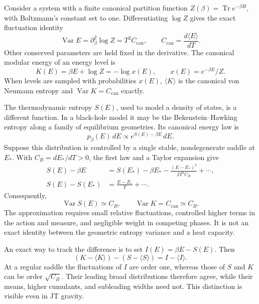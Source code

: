\documentclass[11pt,letterpaper]{article}
\theoremstyle{plain}
\theoremstyle{definition}
\theoremstyle{remark}
\begin{document}
Consider a system with a finite canonical partition function
$Z(\beta)=\operatorname{Tr}e^{-\beta H}$, with Boltzmann's constant set to one.
Differentiating $\log Z$ gives the exact fluctuation identity
\begin{equation}
 \operatorname{Var}E=\partial_\beta^2\log Z=T^2C_{\mathrm{can}},
 \qquad C_{\mathrm{can}}=\frac{d\langle E\rangle}{dT}.
 \label{eq08:energy_fluctuations}
\end{equation}
Other conserved parameters are held fixed in the derivative. The canonical
modular energy of an energy level is
\begin{equation}
 K(E)=\beta E+\log Z=-\log x(E),\qquad
 x(E)=e^{-\beta E}/Z.
 \label{eq08:modular_energy}
\end{equation}
When levels are sampled with probabilities $x(E)$,
$\langle K\rangle$ is the canonical von Neumann entropy and
$\operatorname{Var}K=C_{\mathrm{can}}$ exactly.

The thermodynamic entropy $S(E)$, used to model a density of states, is a
different function. In a black-hole model it may be the Bekenstein--Hawking
entropy along a family of equilibrium geometries. Its canonical energy law is
\begin{equation*}
 p_\beta(E)\,dE\propto e^{S(E)-\beta E}\,dE.
\end{equation*}
Suppose this distribution is controlled by a single stable, nondegenerate saddle at $E_*$. With
$C_B=dE_*/dT>0$, the first law and a Taylor expansion give
\begin{align}
 S(E)-\beta E
 &=S(E_*)-\beta E_*
   -\frac{(E-E_*)^2}{2T^2C_B}+\cdots,\\
 S(E)-S(E_*)&=\frac{E-E_*}{T}+\cdots.
\end{align}
Consequently,
\begin{equation}
 \operatorname{Var}S(E)\simeq C_B,
 \qquad \operatorname{Var}K=C_{\mathrm{can}}\simeq C_B.
 \label{eq08:sigma_squared}
\end{equation}
The approximation requires small relative fluctuations, controlled higher
terms in the action and measure, and negligible weight in competing phases.
It is not an exact identity between the geometric entropy variance and a
heat capacity.

An exact way to track the difference is to set $I(E)=\beta E-S(E)$. Then
\begin{equation}
 (K-\langle K\rangle)-(S-\langle S\rangle)=I-\langle I\rangle.
 \label{eq08:centered_dictionary}
\end{equation}
At a regular saddle the fluctuations of $I$ are order one, whereas those of
$S$ and $K$ can be order $\sqrt{C_B}$. Their leading broad distributions
therefore agree, while their means, higher cumulants, and subleading widths
need not. This distinction is visible even in JT gravity.
\end{document}
